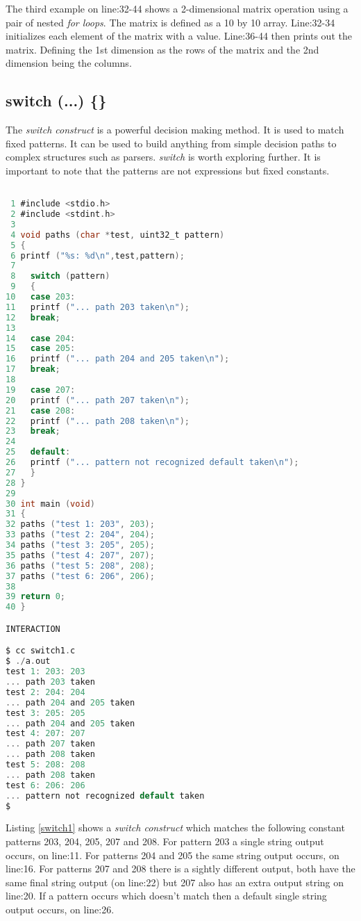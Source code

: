 The third example on line:32-44 shows a 2-dimensional matrix operation using a pair of nested \textit{for loops}. The matrix is defined as a 10 by 10 array. Line:32-34 initializes each element of the matrix with a value. Line:36-44 then prints out the matrix. Defining the 1st dimension as the rows of the matrix and the 2nd dimension being the columns.

\subsection{switch (...) \{\}}


The \textit{switch construct} is a powerful decision making method. It is used to match fixed patterns. It can be used to build anything from simple decision paths to complex structures such as parsers. \textit{switch} is worth exploring further. It is important to note that the patterns are not expressions but fixed constants.

\begin{lstlisting}[language=C,showstringspaces=false, caption={File switch1.c, switch...case example},captionpos=b,label=switch1]

 1 #include <stdio.h>
 2 #include <stdint.h>
 3 
 4 void paths (char *test, uint32_t pattern)
 5 {
 6 printf ("%s: %d\n",test,pattern);
 7 
 8   switch (pattern)
 9   {
10   case 203:
11   printf ("... path 203 taken\n");
12   break;
13 
14   case 204:
15   case 205:
16   printf ("... path 204 and 205 taken\n");
17   break;
18 
19   case 207:
20   printf ("... path 207 taken\n");
21   case 208:
22   printf ("... path 208 taken\n");
23   break;
24   
25   default:
26   printf ("... pattern not recognized default taken\n");
27   } 
28 }
29   
30 int main (void)
31 {
32 paths ("test 1: 203", 203);
33 paths ("test 2: 204", 204);
34 paths ("test 3: 205", 205);
35 paths ("test 4: 207", 207);
36 paths ("test 5: 208", 208);
37 paths ("test 6: 206", 206);
38 
39 return 0;
40 }

INTERACTION

$ cc switch1.c
$ ./a.out
test 1: 203: 203
... path 203 taken
test 2: 204: 204
... path 204 and 205 taken
test 3: 205: 205
... path 204 and 205 taken
test 4: 207: 207
... path 207 taken
... path 208 taken
test 5: 208: 208
... path 208 taken
test 6: 206: 206
... pattern not recognized default taken
$

\end{lstlisting}

Listing \ref{switch1} shows a \textit{switch construct} which matches the following constant patterns 203, 204, 205, 207 and 208. For pattern 203 a single string output occurs, on line:11. For patterns 204 and 205 the same string output occurs, on line:16. For patterns 207 and 208 there is a sightly different output, both have the same final string output (on line:22) but 207 also has an extra output string on line:20. If a pattern occurs which doesn't match then a default single string output occurs, on line:26. 

